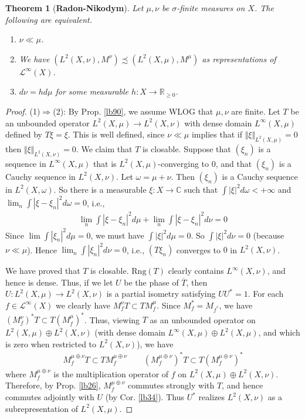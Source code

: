 \documentclass[12pt,b5paper,notitlepage]{article}
\theoremstyle{definition}
\theoremstyle{plain}
\newtheorem{thm}[df]{Theorem}
\newcommand{\mc}{\mathcal}
\newcommand{\ovl}{\overline}
\newcommand{\Cbb}{\mathbb C}
\newcommand{\Rbb}{\mathbb R}
\newcommand{\Rng}{\mathrm{Rng}}
\numberwithin{equation}{section}
\begin{document}
\begin{thm}[\textbf{Radon-Nikodym}]\label{lb91}
Let $\mu,\nu$ be $\sigma$-finite measures on $X$. The following are equivalent.
\begin{enumerate}[label=(\arabic*)]
\item $\nu\ll\mu$.
\item We have $(L^2(X,\nu),M^\nu)\precsim(L^2(X,\mu),M^\mu)$ as representations of $\mc L^\infty(X)$.
\item $d\nu=hd\mu$ for some measurable $h:X\rightarrow\Rbb_{\geq0}$.
\end{enumerate}
\end{thm}

\begin{proof}
(1)$\Rightarrow$(2): By Prop. \ref{lb90}, we assume WLOG that $\mu,\nu$ are finite. Let $T$ be an unbounded operator $L^2(X,\mu)\rightarrow L^2(X,\nu)$ with dense domain $L^\infty(X,\mu)$ defined by $T\xi=\xi$. This is well defined, since $\nu\ll\mu$ implies that if $\Vert\xi\Vert_{L^2(X,\mu)}=0$ then $\Vert \xi\Vert_{L^2(X,\nu)}=0$. We claim that $T$ is closable. Suppose that $(\xi_n)$ is a sequence in $L^\infty(X,\mu)$ that is $L^2(X,\mu)$-converging to $0$, and that $(\xi_n)$ is a Cauchy sequence in $L^2(X,\nu)$. Let $\omega=\mu+\nu$. Then $(\xi_n)$ is a Cauchy sequence in $L^2(X,\omega)$. So there is a measurable $\xi:X\rightarrow\Cbb$ such that $\int|\xi|^2d\omega<+\infty$ and $\lim_n\int|\xi-\xi_n|^2d\omega=0$, i.e.,
\begin{align*}
\lim_n\int|\xi-\xi_n|^2d\mu+\lim_n\int|\xi-\xi_n|^2d\nu=0
\end{align*}
Since $\lim\int |\xi_n|^2d\mu=0$, we must have $\int |\xi|^2d\mu=0$. So $\int|\xi|^2d\nu=0$ (because $\nu\ll\mu$). Hence $\lim_n\int|\xi_n|^2d\nu=0$, i.e., $(T\xi_n)$ converges to $0$ in $L^2(X,\nu)$.

We have proved that $T$ is closable. $\Rng(T)$ clearly contains $L^\infty(X,\nu)$, and hence is dense. Thus, if we let $U$ be the phase of $\ovl T$, then $U:L^2(X,\mu)\rightarrow L^2(X,\nu)$ is a partial isometry satisfying $UU^*=1$.  For each $f\in\mc L^\infty(X)$ we clearly have $M_f^\nu T\subset TM_f^\mu$. Since $M_f^*=M_{f^*}$, we have $(M_f^\nu)^*T\subset T(M_f^\mu)^*$. Thus, viewing $T$ as an unbounded operator on $L^2(X,\mu)\oplus L^2(X,\nu)$ (with dense domain $L^\infty(X,\mu)\oplus L^2(X,\mu)$, and which is zero when restricted to $L^2(X,\nu)$), we have
\begin{align*}
M^{\mu\oplus\nu}_fT\subset TM^{\mu\oplus\nu}_f\qquad (M^{\mu\oplus\nu}_f)^*T\subset T(M^{\mu\oplus\nu}_f)^*
\end{align*}
where $M^{\mu\oplus\nu}_f$ is the multiplication operator of $f$ on $L^2(X,\mu)\oplus L^2(X,\nu)$. Therefore, by Prop. \ref{lb26}, $M^{\mu\oplus\nu}_f$ commutes strongly with $T$, and hence commutes adjointly with $U$ (by Cor. \ref{lb34}). Thus $U^*$ realizes $L^2(X,\nu)$ as a subrepresentation of $L^2(X,\mu)$. 


\end{proof}
\end{document}
